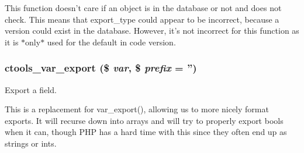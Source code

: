 This function doesn't care if an object is in the database or not and does not check. This means that export\_\-type could appear to be incorrect, because a version could exist in the database. However, it's not incorrect for this function as it is $\ast$only$\ast$ used for the default in code version. \hypertarget{export_8inc_a430da819e5a29ba94fcc25dd949a942b}{
\subsubsection[{ctools\_\-var\_\-export}]{\setlength{\rightskip}{0pt plus 5cm}ctools\_\-var\_\-export (\$ {\em var}, \/  \$ {\em prefix} = {\ttfamily ''})}}
\label{export_8inc_a430da819e5a29ba94fcc25dd949a942b}
Export a field.

This is a replacement for var\_\-export(), allowing us to more nicely format exports. It will recurse down into arrays and will try to properly export bools when it can, though PHP has a hard time with this since they often end up as strings or ints. 